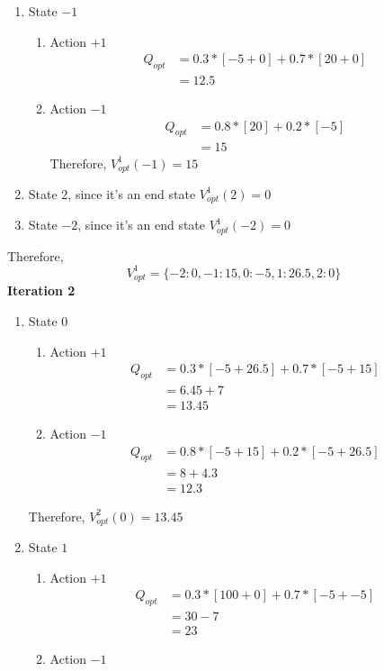 \documentclass[12pt]{article}
\begin{document}
\begin{enumerate}[label=(\alph*)]
\begin{enumerate}
 	\item State $-1$ \\
 	\begin{enumerate}
 		\item Action $+1$
 		\begin{align*}
 		Q_{opt} &= 0.3 * [-5 + 0] + 0.7 * [20 + 0] \\
 		&= 12.5
 		\end{align*}
 		\item Action $-1$
 		\begin{align*}
 		Q_{opt} &= 0.8 * [20] + 0.2 * [-5] \\
 		&= 15
 		\end{align*}
 		Therefore, $V_{opt}^1(-1) = 15$
 	\end{enumerate}
 	\item State $2$, since it's an end state $V_{opt}^1(2) = 0$
 	\item State $-2$, since it's an end state $V_{opt}^1(-2) = 0$
 \end{enumerate}
 Therefore,
 $$V_{opt}^1 = \{ -2:0, -1: 15, 0: -5, 1: 26.5, 2:0 \}$$
 \textbf{Iteration 2}
 \begin{enumerate}
 \item State $0$
 \begin{enumerate}
	\item Action $+1$
	 \begin{align*}
	 Q_{opt} &= 0.3 * [-5 + 26.5] + 0.7 * [-5 + 15] \\
	 &= 6.45 + 7 \\
	 &= 13.45
	 \end{align*} 
	 \item Action $-1$
	 \begin{align*}
	 Q_{opt} &= 0.8 * [-5 + 15] + 0.2 * [-5 + 26.5] \\
	 &= 8 + 4.3 \\
	 &= 12.3
	 \end{align*}
 \end{enumerate}
 Therefore, $V_{opt}^2(0) = 13.45$
 \item State $1$
	\begin{enumerate}
		\item Action $+1$ \\
			\begin{align*}
				Q_{opt} &= 0.3 * [100 + 0] + 0.7 * [-5 + -5] \\
				&= 30 - 7 \\
				&= 23
			\end{align*}
		\item Action $-1$ \\

\end{enumerate}
\end{enumerate}
\end{enumerate}
\end{document}
